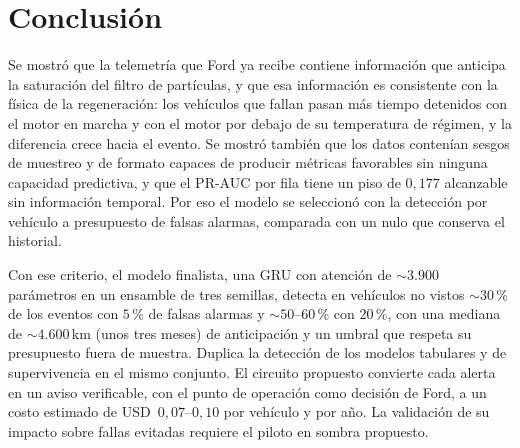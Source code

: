 \section{Conclusión}
\label{sec:conclusion}

Se mostró que la telemetría que Ford ya recibe contiene información que anticipa la saturación del filtro de partículas, y
que esa información es consistente con la física de la regeneración: los vehículos que fallan pasan más tiempo detenidos con
el motor en marcha y con el motor por debajo de su temperatura de régimen, y la diferencia crece hacia el evento. Se mostró
también que los datos contenían sesgos de muestreo y de formato capaces de producir métricas favorables sin ninguna
capacidad predictiva, y que el PR-AUC por fila tiene un piso de $0{,}177$ alcanzable sin información temporal. Por eso el
modelo se seleccionó con la detección por vehículo a presupuesto de falsas alarmas, comparada con un nulo que conserva el
historial.

Con ese criterio, el modelo finalista, una GRU con atención de $\sim 3.900$ parámetros en un ensamble de tres semillas,
detecta en vehículos no vistos $\sim 30\,\%$ de los eventos con $5\,\%$ de falsas alarmas y $\sim 50$--$60\,\%$ con $20\,\%$,
con una mediana de $\sim 4.600$\,km (unos tres meses) de anticipación y un umbral que respeta su presupuesto fuera de
muestra. Duplica la detección de los modelos tabulares y de supervivencia en el mismo conjunto. El circuito propuesto
convierte cada alerta en un aviso verificable, con el punto de operación como decisión de Ford, a un costo estimado de
USD~$0{,}07$--$0{,}10$ por vehículo y por año. La validación de su impacto sobre fallas evitadas requiere el piloto en sombra
propuesto.
